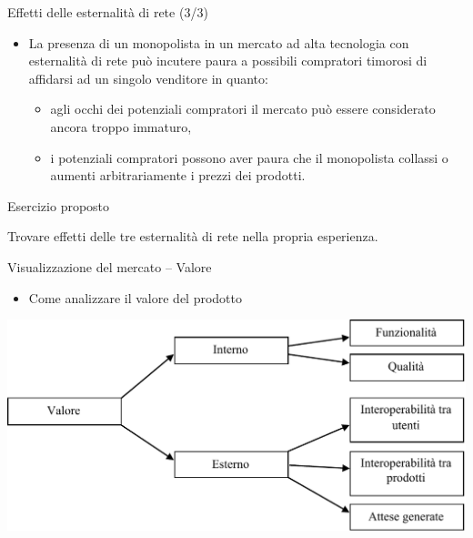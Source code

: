 \documentclass{beamer}
\begin{document}
\begin{frame}
{\centerline{Effetti delle esternalit\`{a} di rete (3/3)}}

\begin{itemize}

\item La presenza di un monopolista in un mercato ad alta tecnologia con esternalit\`{a} di rete pu\`{o} incutere paura a possibili compratori timorosi di affidarsi ad un singolo venditore in quanto:
\begin{itemize}
\item agli occhi dei potenziali compratori il mercato pu\`{o} essere considerato ancora troppo immaturo,
\item i potenziali compratori possono aver paura che il monopolista collassi o aumenti arbitrariamente i prezzi dei prodotti.
\end{itemize}

\end{itemize}

\end{frame}


\begin{frame}
{\centerline{Esercizio proposto}}
\vspace{1cm}
\begin{center}
    \LARGE{Trovare effetti delle tre esternalit\`{a} di rete nella propria esperienza.}
\end{center}

\end{frame}

\begin{frame}
{\centerline{Visualizzazione del mercato -- Valore}}
\begin{itemize}
    \item Come analizzare il valore del prodotto
\end{itemize} 
\begin{center}
    \includegraphics[width=\textwidth]{P2023.AIBCCSS.IlConcettoDiSoftware/ValoreDelProdotto.pdf}
\end{center}

\end{frame}
\end{document}
